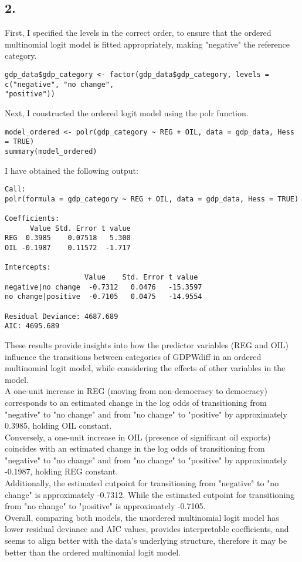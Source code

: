 \documentclass[oneside]{article}
\begin{document}
\subsection*{2.}
First, I specified the levels in the correct order, to ensure that the ordered multinomial logit model is fitted appropriately, making "negative" the reference category.
\begin{verbatim}
gdp_data$gdp_category <- factor(gdp_data$gdp_category, levels = c("negative", "no change",
"positive"))
\end{verbatim}
\noindent
Next, I constructed the ordered logit model using the polr function.
\begin{verbatim}
model_ordered <- polr(gdp_category ~ REG + OIL, data = gdp_data, Hess = TRUE)
summary(model_ordered)
\end{verbatim}
I have obtained the following output:
\begin{verbatim}
Call:
polr(formula = gdp_category ~ REG + OIL, data = gdp_data, Hess = TRUE)

Coefficients:
      Value Std. Error t value
REG  0.3985    0.07518   5.300
OIL -0.1987    0.11572  -1.717

Intercepts:
                   Value    Std. Error t value 
negative|no change  -0.7312   0.0476   -15.3597
no change|positive  -0.7105   0.0475   -14.9554

Residual Deviance: 4687.689 
AIC: 4695.689
\end{verbatim}
\noindent
These results provide insights into how the predictor variables (REG and OIL) influence the transitions between categories of GDPWdiff in an ordered multinomial logit model, while considering the effects of other variables in the model.
\\
A one-unit increase in REG (moving from non-democracy to democracy) corresponds to an estimated change in the log odds of transitioning from "negative" to "no change" and from "no change" to "positive" by approximately 0.3985, holding OIL constant.
\\
Conversely, a one-unit increase in OIL (presence of significant oil exports) coincides with an estimated change in the log odds of transitioning from "negative" to "no change" and from "no change" to "positive" by approximately -0.1987, holding REG constant.
\\
Additionally, the estimated cutpoint for transitioning from "negative" to "no change" is approximately -0.7312.
While the estimated cutpoint for transitioning from "no change" to "positive" is approximately -0.7105.
\\
Overall, comparing both models, the unordered multinomial logit model has lower residual deviance and AIC values, provides interpretable coefficients, and seems to align better with the data's underlying structure, therefore it may be better than the ordered multinomial logit model. 
\end{document}
